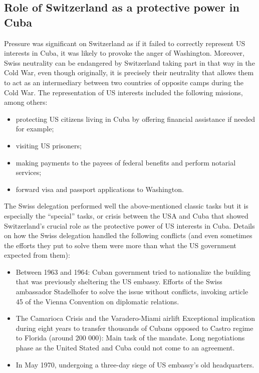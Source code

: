 \documentclass[a4paper]{article}
\begin{document}
\subsection{Role of Switzerland as a protective power in Cuba}
Pressure was significant on Switzerland as if it failed to correctly represent US interests in Cuba, it was likely to provoke the anger of Washington. 
Moreover, Swiss neutrality can be endangered by Switzerland taking part in that way in the Cold War, even though originally, it is precisely their neutrality that allows them to act as an intermediary between two countries of opposite camps during the Cold War. 
The representation of US interests included the following missions, among others:
\begin{itemize}
\item protecting US citizens living in Cuba by offering financial assistance if needed for example;
\item visiting US prisoners;
\item making payments to the payees of federal benefits and perform notarial services;
\item forward visa and passport applications to Washington.
\end{itemize}
The Swiss delegation performed well the above-mentioned classic tasks but it is especially the “special” tasks, or crisis between the USA and Cuba that showed Switzerland’s crucial role as the protective power of US interests in Cuba. 
Details on how the Swiss delegation handled the following conflicts (and even sometimes the efforts they put to solve them were more than what the US government expected from them): 
\begin{itemize}
\item Between 1963 and 1964: Cuban government tried to nationalize the building that was previously sheltering the US embassy.
Efforts of the Swiss ambassador Stadelhofer to solve the issue without conflicts, invoking article 45 of the Vienna Convention on diplomatic relations. 
\item The Camarioca Crisis and the Varadero-Miami airlift 
Exceptional implication during eight years to transfer thousands of Cubans opposed to Castro regime to Florida (around 200 000): Main task of the mandate.
Long negotiations phase as the United Stated and Cuba could not come to an agreement. 
\item In May 1970, undergoing a three-day siege of US embassy’s old headquarters.
\end{itemize}
\end{document}
